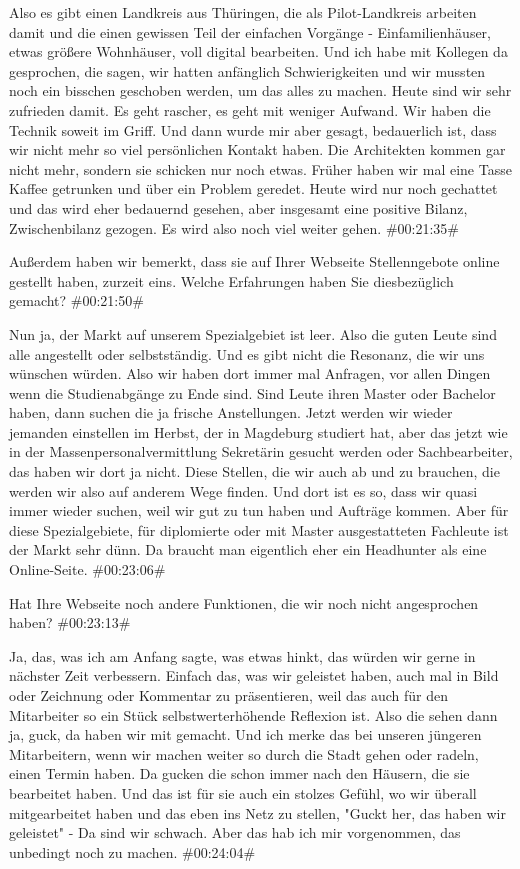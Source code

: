 \documentclass[a4paper, 12pt]{scrartcl}
\begin{document}
\begin{description}
\Andre Also es gibt einen Landkreis aus Thüringen, die als Pilot-Landkreis arbeiten damit und die einen gewissen Teil der einfachen Vorgänge - Einfamilienhäuser, etwas größere Wohnhäuser, voll digital bearbeiten. Und ich habe mit Kollegen da gesprochen, die sagen, wir hatten anfänglich Schwierigkeiten und wir mussten noch ein bisschen geschoben werden, um das alles zu machen. Heute sind wir sehr zufrieden damit. Es geht rascher, es geht mit weniger Aufwand. Wir haben die Technik soweit im Griff. Und dann wurde mir aber gesagt, bedauerlich ist, dass wir nicht mehr so viel persönlichen Kontakt haben. Die Architekten kommen gar nicht mehr, sondern sie schicken nur noch etwas. Früher haben wir mal eine Tasse Kaffee getrunken und über ein Problem geredet. Heute wird nur noch gechattet und das wird eher bedauernd gesehen, aber insgesamt eine positive Bilanz, Zwischenbilanz gezogen. Es wird also noch viel weiter gehen. \#00:21:35\#

\Fabian Außerdem haben wir bemerkt, dass sie auf Ihrer Webseite Stellenngebote online gestellt haben, zurzeit eins. Welche Erfahrungen haben Sie diesbezüglich gemacht? \#00:21:50\#

\Andre Nun ja, der Markt auf unserem Spezialgebiet ist leer. Also die guten Leute sind alle angestellt oder selbstständig. Und es gibt nicht die Resonanz, die wir uns wünschen würden. Also wir haben dort immer mal Anfragen, vor allen Dingen wenn die Studienabgänge zu Ende sind. Sind Leute ihren Master oder Bachelor haben, dann suchen die ja frische Anstellungen. Jetzt werden wir wieder jemanden einstellen im Herbst, der in Magdeburg studiert hat, aber das jetzt wie in der Massenpersonalvermittlung Sekretärin gesucht werden oder Sachbearbeiter, das haben wir dort ja nicht. Diese Stellen, die wir auch ab und zu brauchen, die werden wir also auf anderem Wege finden. Und dort ist es so, dass wir quasi immer wieder suchen, weil wir gut zu tun haben und Aufträge kommen. Aber für diese Spezialgebiete, für diplomierte oder mit Master ausgestatteten Fachleute ist der Markt sehr dünn. Da braucht man eigentlich eher ein Headhunter als eine Online-Seite. \#00:23:06\#

\Fabian Hat Ihre Webseite noch andere Funktionen, die wir noch nicht angesprochen haben? \#00:23:13\#

\Andre Ja, das, was ich am Anfang sagte, was etwas hinkt, das würden wir gerne in nächster Zeit verbessern. Einfach das, was wir geleistet haben, auch mal in Bild oder Zeichnung oder Kommentar zu präsentieren, weil das auch für den Mitarbeiter so ein Stück selbstwerterhöhende Reflexion ist. Also die sehen dann ja, guck, da haben wir mit gemacht. Und ich merke das bei unseren jüngeren Mitarbeitern, wenn wir machen weiter so durch die Stadt gehen oder radeln, einen Termin haben. Da gucken die schon immer nach den Häusern, die sie bearbeitet haben. Und das ist für sie auch ein stolzes Gefühl, wo wir überall mitgearbeitet haben und das eben ins Netz zu stellen, "Guckt her, das haben wir geleistet" - Da sind wir schwach. Aber das hab ich mir vorgenommen, das unbedingt noch zu machen. \#00:24:04\#


\end{description}
\end{document}
